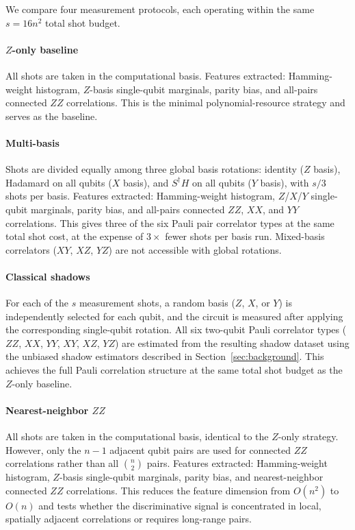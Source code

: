 \documentclass[conference]{IEEEtran}
\newcommand{\nqubits}{n}
\newcommand{\shots}{s}
\begin{document}
We compare four measurement protocols, each operating within the same $\shots = 16\nqubits^2$ total shot budget.

\paragraph{$Z$-only baseline}
All shots are taken in the computational basis.
Features extracted: Hamming-weight histogram, $Z$-basis single-qubit marginals, parity bias, and all-pairs connected $ZZ$ correlations.
This is the minimal polynomial-resource strategy and serves as the baseline.

\paragraph{Multi-basis}
Shots are divided equally among three global basis rotations: identity ($Z$ basis), Hadamard on all qubits ($X$ basis), and $S^\dagger H$ on all qubits ($Y$ basis), with $\shots/3$ shots per basis.
Features extracted: Hamming-weight histogram, $Z$/$X$/$Y$ single-qubit marginals, parity bias, and all-pairs connected $ZZ$, $XX$, and $YY$ correlations.
This gives three of the six Pauli pair correlator types at the same total shot cost, at the expense of $3\times$ fewer shots per basis run.
Mixed-basis correlators ($XY$, $XZ$, $YZ$) are not accessible with global rotations.

\paragraph{Classical shadows}
For each of the $\shots$ measurement shots, a random basis ($Z$, $X$, or $Y$) is independently selected for each qubit, and the circuit is measured after applying the corresponding single-qubit rotation.
All six two-qubit Pauli correlator types ($ZZ$, $XX$, $YY$, $XY$, $XZ$, $YZ$) are estimated from the resulting shadow dataset using the unbiased shadow estimators described in Section~\ref{sec:background}.
This achieves the full Pauli correlation structure at the same total shot budget as the $Z$-only baseline.

\paragraph{Nearest-neighbor $ZZ$}
All shots are taken in the computational basis, identical to the $Z$-only strategy.
However, only the $\nqubits - 1$ adjacent qubit pairs are used for connected $ZZ$ correlations rather than all $\binom{\nqubits}{2}$ pairs.
Features extracted: Hamming-weight histogram, $Z$-basis single-qubit marginals, parity bias, and nearest-neighbor connected $ZZ$ correlations.
This reduces the feature dimension from $O(\nqubits^2)$ to $O(\nqubits)$ and tests whether the discriminative signal is concentrated in local, spatially adjacent correlations or requires long-range pairs.
\end{document}
